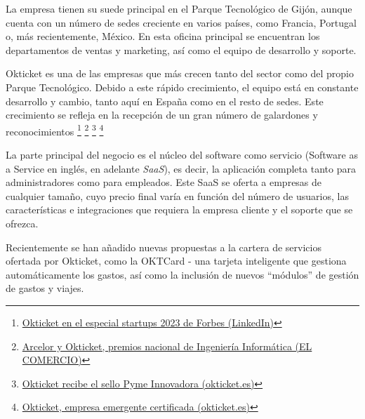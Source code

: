 La empresa tienen su suede principal  en el Parque Tecnológico de Gijón, aunque cuenta con un número
de sedes creciente en varios países, como Francia, Portugal o, más recientemente, México. En esta
oficina principal se encuentran los departamentos de ventas y marketing, así como el equipo de
desarrollo y soporte.

Okticket es una de las empresas que más crecen tanto del sector como del propio Parque
Tecnológico. Debido a este rápido crecimiento, el equipo está en constante desarrollo y
cambio, tanto aquí en España como en el resto de sedes. Este crecimiento se refleja
en la recepción de un gran número de galardones y reconocimientos
\footnote{\href{https://www.linkedin.com/posts/okticket_okticket-en-el-especial-startups-de-forbes-activity-7140622980618903552-UGWK}{Okticket en el especial startups 2023 de Forbes (LinkedIn)}}
\footnote{\href{https://www.elcomercio.es/economia/arcelor-okticket-premios-20230222002438-ntvo.html}{Arcelor y Okticket, premios nacional de Ingeniería Informática (EL COMERCIO)}}
\footnote{\href{https://www.okticket.es/blog/empresa-pyme-innovadora}{Okticket recibe el sello Pyme Innovadora (okticket.es)}}
\footnote{\href{https://www.okticket.es/blog/okticket-empresa-emergente-certificada}{Okticket, empresa emergente certificada (okticket.es)}}

La parte principal del negocio es el núcleo del software como servicio (Software as a
Service en inglés, en adelante \textit{SaaS}), es decir, la aplicación completa tanto
para administradores como para empleados. Este SaaS se oferta a empresas de cualquier
tamaño, cuyo precio final varía en función del número de usuarios, las características
e integraciones que requiera la empresa cliente y el soporte que se ofrezca.

Recientemente se han añadido nuevas propuestas a la cartera de servicios ofertada por
Okticket, como la OKTCard {-} una tarjeta inteligente que gestiona automáticamente los gastos,
así como la inclusión de nuevos ``módulos'' de gestión de gastos y viajes.
